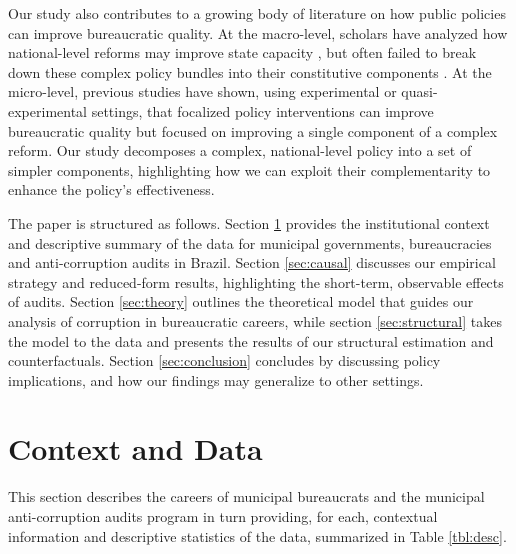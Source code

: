 \documentclass[12pt,a4paper]{article}
\theoremstyle{definition}
\begin{document}

Our study also contributes to a growing body of literature on how public policies can improve bureaucratic quality. At the macro-level, scholars have analyzed how national-level reforms may improve state capacity \citep{evans_embedded_1995, grindle_jobs_2012}, but often failed to break down these complex policy bundles into their constitutive components \citep{centeno_unpacking_2017}. At the micro-level, previous studies have shown, using experimental or quasi-experimental settings, that focalized policy interventions can improve bureaucratic quality \citep{duflo_incentives_2012, dal2013strengthening} but focused on improving a single component of a complex reform. Our study decomposes a complex, national-level policy into a set of simpler components, highlighting how we can exploit their complementarity to enhance the policy's effectiveness.

The paper is structured as follows. Section \ref{sec:data} provides the institutional context and descriptive summary of the data for municipal governments, bureaucracies and anti-corruption audits in Brazil. Section \ref{sec:causal} discusses our empirical strategy and reduced-form results, highlighting the short-term, observable effects of audits. Section \ref{sec:theory} outlines the theoretical model that guides our analysis of corruption in bureaucratic careers, while section \ref{sec:structural} takes the model to the data and presents the results of our structural estimation and counterfactuals. Section \ref{sec:conclusion} concludes by discussing policy implications, and how our findings may generalize to other settings.

\section{Context and Data}
\label{sec:data}


This section describes the careers of municipal bureaucrats and the municipal anti-corruption audits program in turn providing, for each, contextual information and descriptive statistics of the data, summarized in Table \ref{tbl:desc}. 
\end{document}
